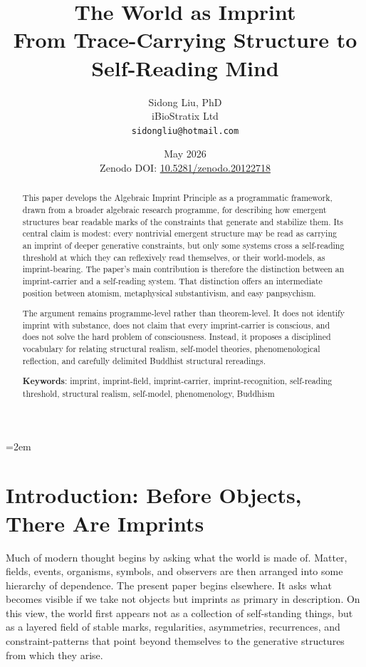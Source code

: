 \documentclass[12pt]{article}
\title{%
  \textbf{The World as Imprint}\\
  \textbf{From Trace-Carrying Structure to Self-Reading Mind}%
}
\author{
  Sidong Liu, PhD \\
  \small iBioStratix Ltd \\
  \small \texttt{sidongliu@hotmail.com}
}
\date{May 2026\\
\small Zenodo DOI: \href{https://doi.org/10.5281/zenodo.20122718}{10.5281/zenodo.20122718}}
\begin{document}
\emergencystretch=2em
\raggedbottom
{}

\maketitle

\begin{abstract}
This paper develops the Algebraic Imprint Principle as a programmatic framework, drawn from a broader algebraic research programme, for describing how emergent structures bear readable marks of the constraints that generate and stabilize them. Its central claim is modest: every nontrivial emergent structure may be read as carrying an imprint of deeper generative constraints, but only some systems cross a self-reading threshold at which they can reflexively read themselves, or their world-models, as imprint-bearing. The paper's main contribution is therefore the distinction between an imprint-carrier and a self-reading system. That distinction offers an intermediate position between atomism, metaphysical substantivism, and easy panpsychism.

The argument remains programme-level rather than theorem-level. It does not identify imprint with substance, does not claim that every imprint-carrier is conscious, and does not solve the hard problem of consciousness. Instead, it proposes a disciplined vocabulary for relating structural realism, self-model theories, phenomenological reflection, and carefully delimited Buddhist structural rereadings.

\medskip

\noindent\textbf{Keywords}: imprint, imprint-field, imprint-carrier, imprint-recognition, self-reading threshold, structural realism, self-model, phenomenology, Buddhism
\end{abstract}

\clearpage
\tableofcontents
\clearpage

\section{Introduction: Before Objects, There Are Imprints}

Much of modern thought begins by asking what the world is made of. Matter, fields, events, organisms, symbols, and observers are then arranged into some hierarchy of dependence. The present paper begins elsewhere. It asks what becomes visible if we take not objects but imprints as primary in description. On this view, the world first appears not as a collection of self-standing things, but as a layered field of stable marks, regularities, asymmetries, recurrences, and constraint-patterns that point beyond themselves to the generative structures from which they arise.
\end{document}
